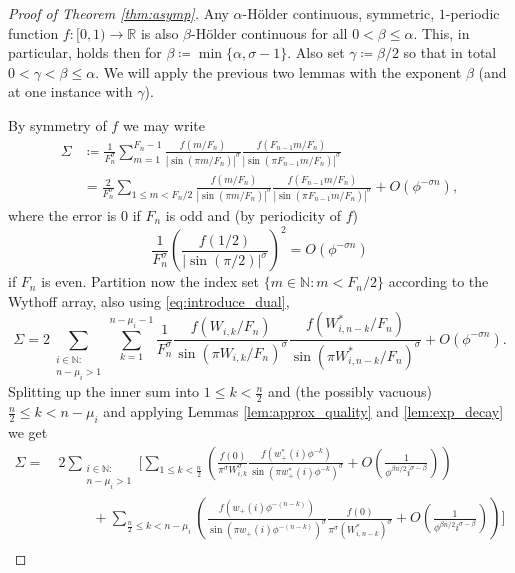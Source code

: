 \documentclass[]{interact}
\newcommand{\bbN}{\mathbb{N}}
\newcommand{\bbR}{\mathbb{R}}
\theoremstyle{definition}
\numberwithin{table}{section} %
\numberwithin{figure}{section}
\begin{document}
\begin{proof}[Proof of Theorem \ref{thm:asymp}]
    Any $\alpha$-Hölder continuous, symmetric, $1$-periodic function $f: [0, 1) \rightarrow \bbR$ is also $\beta$-Hölder continuous for all $0 < \beta \leq \alpha$. This, in particular, holds then for $\beta \coloneq \min\{\alpha, \sigma -1\}$. Also set $\gamma \coloneqq \beta/2$ so that in total $0 < \gamma < \beta \leq \alpha$. We will apply the previous two lemmas with the exponent $\beta$ (and at one instance with $\gamma$).

    By symmetry of $f$ we may write
    \begin{align*}
        \Sigma & \coloneqq \frac1{F_n^\sigma} \sum_{m = 1}^{F_n-1} \frac{f(m/F_n)}{\left|{\sin(\pi m/F_n)}\right|^\sigma} \frac{f(F_{n-1}m/F_n)}{\left|{\sin(\pi F_{n-1}m/F_n)}\right|^\sigma} \\
        & = \frac2{F_n^\sigma} \sum_{1 \leq m < F_n/2} \frac{f(m/F_n)}{\left|{\sin(\pi m/F_n)}\right|^\sigma} \frac{f(F_{n-1}m/F_n)}{\left|{\sin(\pi F_{n-1}m/F_n)}\right|^\sigma} + O(\phi^{-\sigma n}),
    \end{align*}
    where the error is $0$ if $F_n$ is odd and (by periodicity of $f$)
    $$
    \frac1{F_n^\sigma} \left(\frac{f(1/2)}{\left|{\sin(\pi/2)}\right|^\sigma}\right)^2 = O(\phi^{-\sigma n})
    $$
    if $F_n$ is even. Partition now the index set $\{m \in \bbN: m < F_n/2\}$ according to the Wythoff array, also using \eqref{eq:introduce_dual},
    $$
    \Sigma = 2\sum_{\substack{i \in \bbN: \\ n - \mu_i > 1}} \sum_{k=1}^{n-\mu_i-1} \frac1{F_n^\sigma} \frac{f(W_{i, k}/F_n)}{\sin(\pi W_{i, k}/F_n)^\sigma} \frac{f(W_{i, n-k}^*/F_n)}{\sin(\pi W_{i, n-k}^*/F_n)^\sigma} + O(\phi^{-\sigma n}).
    $$
    Splitting up the inner sum into $1 \leq k < \frac n2$ and (the possibly vacuous) $\frac n2 \leq k < n-\mu_i$ and applying Lemmas \ref{lem:approx_quality} and \ref{lem:exp_decay} we get
    \begin{align*}
        \Sigma = ~& 2\sum_{\substack{i \in \bbN: \\ n - \mu_i > 1}} \Bigg[ \sum_{1 \leq k < \frac n2} \left(\frac{f(0)}{\pi^\sigma W_{i, k}^\sigma} \frac{f(w_+^*(i) \phi^{-k})}{\sin(\pi w_+^*(i) \phi^{-k})^\sigma} + O\left(\frac1{\phi^{\beta n/2} i^{\sigma-\beta}}\right)\right) \\
        & ~~~~~~~~~~~ + \sum_{\frac n2 \leq k < n-\mu_i} \left(\frac{f(w_+(i) \phi^{-(n-k)})}{{\sin(\pi w_+(i) \phi^{-(n-k)})}^\sigma} \frac{f(0)}{ \pi^\sigma (W_{i, n-k}^*)^\sigma} + O\left(\frac1{\phi^{\beta n/2} i^{\sigma-\beta}}\right)\right) \Bigg] \\

\end{align*}
\end{proof}
\end{document}
